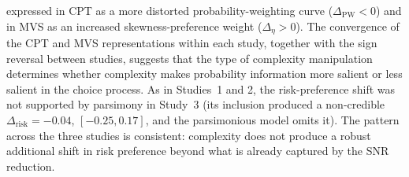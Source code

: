 \documentclass[man,floatsintext]{apa7}
\begin{document}
expressed in CPT as a more distorted probability-weighting curve ($\Delta_{\text{PW}} < 0$) and in MVS as an increased skewness-preference weight ($\Delta_\eta > 0$). The convergence of the CPT and MVS representations within each study, together with the sign reversal between studies, suggests that the type of complexity manipulation determines whether complexity makes probability information more salient or less salient in the choice process. As in Studies~1 and 2, the risk-preference shift was not supported by parsimony in Study~3 (its inclusion produced a non-credible $\Delta_{\text{risk}} = -0.04$, $[-0.25, 0.17]$, and the parsimonious model omits it). The pattern across the three studies is consistent: complexity does not produce a robust additional shift in risk preference beyond what is already captured by the SNR reduction.
\end{document}
